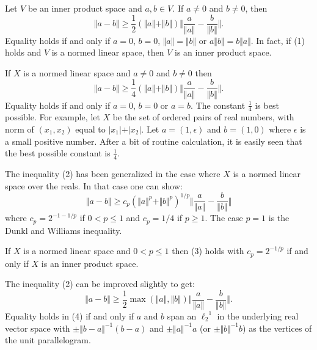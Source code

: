 \documentclass[12pt]{article}
\begin{document}
Let $V$ be an inner product space and $a,b \in V$. If $a \not = 0$ and $b \not = 0$, then 
\begin{equation}
\Vert  a -b \Vert \ge \frac{1}{2}(  \Vert a   \Vert + \Vert b \Vert ) \Vert \frac{a}{\Vert a \Vert} - \frac{b}{\Vert b \Vert} \Vert .
\end{equation}
Equality holds if and only if $a=0$, $b=0$, $\Vert a \Vert = \Vert b \Vert$ 
or $a \Vert b \Vert = b \Vert a \Vert $.
In fact, if (1) holds
and $V$ is a normed linear space, then $V$ is an inner product space.

If $X$ is a normed linear space and $a \not =0$ and $b \not = 0$ then
\begin{equation}
\Vert  a -b \Vert \ge \frac{1}{4}(  \Vert a   \Vert + \Vert b \Vert ) \Vert \frac{a}{\Vert a \Vert} - \frac{b}{\Vert b \Vert} \Vert .
\end{equation}
Equality holds if and only if $a=0$,  $b=0$ or $a=b$.
The constant $\frac{1}{4}$ is best possible. For example, let  $X$ be  the set of  ordered pairs of real numbers,
with norm of $(x_1, x_2)$ equal to $\vert x_1 \vert  + \vert x_2 \vert.$ Let
$a=(1, \epsilon)$ and $b=(1,0)$ where $\epsilon$ is a small positive number. After a bit 
of routine calculation, it is easily seen that the best possible constant is $\frac{1}{4}$.

The inequality (2) has been generalized in the case where $X$ is a normed linear space
over the reals.  In that case one can show:
\begin{equation}
\Vert  a -b \Vert \ge c_p  (  \Vert a   \Vert^p + \Vert b \Vert^p )^{1/p} \Vert \frac{a}{\Vert a \Vert} - \frac{b}{\Vert b \Vert} \Vert 
\end{equation}
where $c_p = 2^{-1-1/p}$ if $0 < p \le 1$ and $c_p = 1/4$ if $p \ge 1$. The case $p=1$ is the
Dunkl and Williams inequality. 

If $X$ is a normed linear space  and $0 < p \le 1$ then (3) holds with $c_p = 2^{-1/p}$ 
if and only if $X$ is an inner product space.

The inequality (2) can be improved slightly to get:
\begin{equation}
\Vert  a -b \Vert \ge \frac{1}{2} \max(\Vert a \Vert, \Vert b \Vert)  \Vert \frac{a}{\Vert a \Vert} - \frac{b}{\Vert b \Vert} \Vert .
\end{equation}
Equality holds in (4) if and only if $a$ and $b$ span an ${\ell_2}^1$ in the underlying real vector space with
$\pm\Vert b-a\Vert^{-1}(b-a)$ and $\pm\Vert a\Vert^{-1}a$ (or $\pm\Vert b\Vert^{-1}b$) as the vertices of the unit
parallelogram.
\end{document}
